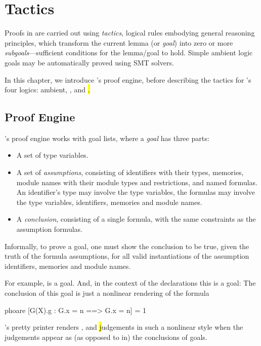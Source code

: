 \chapter{Tactics}
\label{Tactics}

Proofs in \EasyCrypt are carried out using \emph{tactics}, logical
rules embodying general reasoning principles, which transform the
current lemma (or \emph{goal}) into zero or more
\emph{subgoals}---sufficient conditions for the lemma/goal to
hold. Simple ambient logic goals may be automatically proved using SMT
solvers.

In this chapter, we introduce \EasyCrypt's proof engine, before
describing the tactics for \EasyCrypt's four logics: ambient, \prhl,
\phl and \hl.

\section{Proof Engine}

\EasyCrypt's proof engine works with goal lists, where a \emph{goal}
has three parts:
\begin{itemize}
\item A set of type variables.

\item A set of \emph{assumptions}, consisting of identifiers with
  their types, memories, module names with their module types and
  restrictions, and named formulas. An identifier's type may involve
  the type variables, the formulas may involve the type variables,
  identifiers, memories and module names.

\item A \emph{conclusion}, consisting of a single formula, with
  the same constraints as the assumption formulas.
\end{itemize}
Informally, to prove a goal, one must show the conclusion to be true,
given the truth of the formula assumptions, for all valid instantiations
of the assumption identifiers, memories and module names.

For example,
is a goal.
And, in the context of the declarations
this is a goal:
The conclusion of this goal is just a nonlinear rendering of the formula
\begin{easycrypt}{}{}
phoare [G(X).g : G.x = n ==> G.x = n] = 1%
\end{easycrypt}
\EasyCrypt's pretty printer renders \prhl, \phl and \hl judgements
in such a nonlinear style when the judgements appear as
(as opposed to in) the conclusions of goals.

